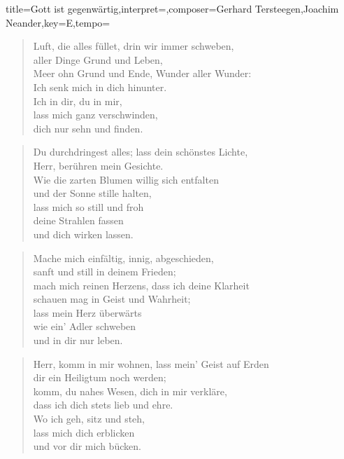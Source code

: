 \documentclass{leadsheet-modern}
\begin{document}
\begin{song}[remember-chords,transpose={0}]{title={Gott ist gegenwärtig},interpret={},composer={{Gerhard Tersteegen},{Joachim Neander}},key={E},tempo={}}
\begin{verse}
Luft, die alles füllet, drin wir immer schweben, \\
aller Dinge Grund und Leben, \\
Meer ohn Grund und Ende, Wunder aller Wunder: \\
Ich senk mich in dich hinunter. \\
Ich in dir,
du in mir, \\
lass mich ganz verschwinden, \\
dich nur sehn und finden.
\end{verse}

\begin{verse}
Du durchdringest alles; lass dein schönstes Lichte, \\
Herr, berühren mein Gesichte. \\
Wie die zarten Blumen willig sich entfalten \\
und der Sonne stille halten, \\
lass mich so
still und froh \\
deine Strahlen fassen \\
und dich wirken lassen.
\end{verse}

\begin{verse}
Mache mich einfältig, innig, abgeschieden, \\
sanft und still in deinem Frieden; \\
mach mich reinen Herzens, dass ich deine Klarheit \\
schauen mag in Geist und Wahrheit; \\
lass mein Herz
überwärts \\
wie ein’ Adler schweben \\
und in dir nur leben.
\end{verse}

\begin{verse}
Herr, komm in mir wohnen, lass mein’ Geist auf Erden \\
dir ein Heiligtum noch werden; \\
komm, du nahes Wesen, dich in mir verkläre, \\
dass ich dich stets lieb und ehre. \\
Wo ich geh,
sitz und steh, \\
lass mich dich erblicken \\
und vor dir mich bücken.
\end{verse}


\end{song}
\end{document}
